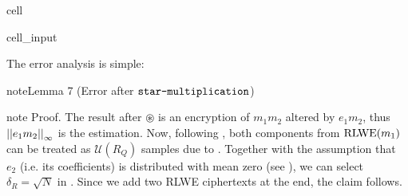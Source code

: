 \documentclass[letterpaper,10pt,english]{jupyterBook}
\begin{document}
\begin{sphinxuseclass}{cell}\begin{sphinxVerbatimInput}

\begin{sphinxuseclass}{cell_input}
\begin{sphinxVerbatim}[commandchars=\\\{\}]
     
      \PYG{p}{[}\PYG{p}{]} \PYG{p}{[}\PYG{p}{]}  
      \PYG{p}{[}\PYG{p}{]} \PYG{p}{[}\PYG{p}{]}  
       
\end{sphinxVerbatim}

\end{sphinxuseclass}\end{sphinxVerbatimInput}

\end{sphinxuseclass}
\sphinxAtStartPar
The error analysis is simple:
\label{Thesis:error-after-star-multiplication}
\begin{sphinxadmonition}{note}{Lemma 7 (Error after \protect\(\texttt{star-multiplication}\protect\))}
\end{sphinxadmonition}

\begin{sphinxadmonition}{note}
\sphinxAtStartPar
Proof. The result after \(\circledast\) is an encryption of \(m_1m_2\) altered by \(e_1m_2\), thus \(\left\lvert\left\lvert e_1m_2 \right\rvert\right\rvert_\infty\) is the estimation.
Now, following {\hyperref[\detokenize{Thesis:error-after-rlwe-x-scalar-multiply}]{}}, both components from \(\mathrm{RLWE}(m_1)\) can be treated as \(\mathcal U(R_Q)\) samples due to {\hyperref[\detokenize{Thesis:decision-RLWE}]{}}.
Together with the assumption that \(e_2\) (i.e. its coefficients) is distributed with mean zero (see {\hyperref[\detokenize{Thesis:conclusion-on-delta-r}]{}}), we can select \(\delta_R = \sqrt{N}\) in {\hyperref[\detokenize{Thesis:error-after-rlwe-x-scalar-multiply}]{}}.
Since we add two RLWE ciphertexts at the end, the claim follows.
\end{sphinxadmonition}
\end{document}
